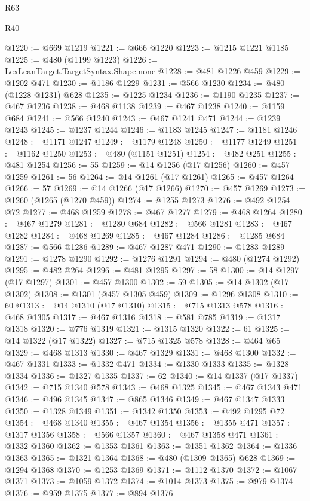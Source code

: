 \begin{lexlean}{R63}
\begin{lexlean}{R40}
\begin{coremodule}
{{{{{{{{{{{{{{{{{{{{{{{{{{{{{{{{{{{{{{{{{{{{{{{{{{{{{{{{{{{{{{{{{{{{{{{{{{{{{{{{{{{{{{{{{{{{{{{{{{{{{{{{{{{{{@1220 := @669 @1219
@1221 := @666 @1220
@1223 := @1215 @1221 @1185
@1225 := @480 (@1199 @1223)
@1226 := LexLeanTarget.TargetSyntax.Shape.none
@1228 := @481 @1226 @459
@1229 := @1202 @471
@1230 := @1186 @1229
@1231 := @566 @1230
@1234 := @480 (@1228 @1231) @628
@1235 := @1225 @1234
@1236 := @1190 @1235
@1237 := @467 @1236
@1238 := @468 @1138
@1239 := @467 @1238
@1240 := @1159 @684
@1241 := @566 @1240
@1243 := @467 @1241 @471
@1244 := @1239 @1243
@1245 := @1237 @1244
@1246 := @1183 @1245
@1247 := @1181 @1246
@1248 := @1171 @1247
@1249 := @1179 @1248
@1250 := @1177 @1249
@1251 := @1162 @1250
@1253 := @480 (@1151 @1251)
@1254 := @482 @251
@1255 := @481 @1254
@1256 := 55
@1259 := @14 @1256 (@17 @1256)
@1260 := @457 @1259
@1261 := 56
@1264 := @14 @1261 (@17 @1261)
@1265 := @457 @1264
@1266 := 57
@1269 := @14 @1266 (@17 @1266)
@1270 := @457 @1269
@1273 := @1260 (@1265 (@1270 @459))
@1274 := @1255 @1273
@1276 := @492 @1254 @72
@1277 := @468 @1259
@1278 := @467 @1277
@1279 := @468 @1264
@1280 := @467 @1279
@1281 := @1280 @684
@1282 := @566 @1281
@1283 := @467 @1282
@1284 := @468 @1269
@1285 := @467 @1284
@1286 := @1285 @684
@1287 := @566 @1286
@1289 := @467 @1287 @471
@1290 := @1283 @1289
@1291 := @1278 @1290
@1292 := @1276 @1291
@1294 := @480 (@1274 @1292)
@1295 := @482 @264
@1296 := @481 @1295
@1297 := 58
@1300 := @14 @1297 (@17 @1297)
@1301 := @457 @1300
@1302 := 59
@1305 := @14 @1302 (@17 @1302)
@1308 := @1301 (@457 @1305 @459)
@1309 := @1296 @1308
@1310 := 60
@1313 := @14 @1310 (@17 @1310)
@1315 := @715 @1313 @578
@1316 := @468 @1305
@1317 := @467 @1316
@1318 := @581 @785
@1319 := @1317 @1318
@1320 := @776 @1319
@1321 := @1315 @1320
@1322 := 61
@1325 := @14 @1322 (@17 @1322)
@1327 := @715 @1325 @578
@1328 := @464 @65
@1329 := @468 @1313
@1330 := @467 @1329
@1331 := @468 @1300
@1332 := @467 @1331
@1333 := @1332 @471
@1334 := @1330 @1333
@1335 := @1328 @1334
@1336 := @1327 @1335
@1337 := 62
@1340 := @14 @1337 (@17 @1337)
@1342 := @715 @1340 @578
@1343 := @468 @1325
@1345 := @467 @1343 @471
@1346 := @496 @1345
@1347 := @865 @1346
@1349 := @467 @1347 @1333
@1350 := @1328 @1349
@1351 := @1342 @1350
@1353 := @492 @1295 @72
@1354 := @468 @1340
@1355 := @467 @1354
@1356 := @1355 @471
@1357 := @1317 @1356
@1358 := @566 @1357
@1360 := @467 @1358 @471
@1361 := @1332 @1360
@1362 := @1353 @1361
@1363 := @1351 @1362
@1364 := @1336 @1363
@1365 := @1321 @1364
@1368 := @480 (@1309 @1365) @628
@1369 := @1294 @1368
@1370 := @1253 @1369
@1371 := @1112 @1370
@1372 := @1067 @1371
@1373 := @1059 @1372
@1374 := @1014 @1373
@1375 := @979 @1374
@1376 := @959 @1375
@1377 := @894 @1376
}}}}}}}}}}}}}}}}}}}}}}}}}}}}}}}}}}}}}}}}}}}}}}}}}}}}}}}}}}}}}}}}}}}}}}}}}}}}}}}}}}}}}}}}}}}}}}}}}}}}}}}}}}}}}
\end{coremodule}
\end{lexlean}
\end{lexlean}
